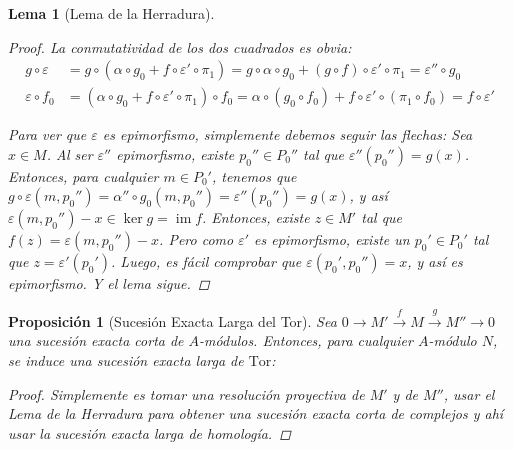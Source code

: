 \documentclass[12pt]{book}
\newtheorem{lem}[teo]{Lema}
\newtheorem{prop}[teo]{Proposición}
\theoremstyle{definition}
\DeclareMathOperator{\im}{im}
\begin{document}
\begin{lem}[Lema de la Herradura]
\begin{proof}
La conmutatividad de los dos cuadrados es obvia: \begin{align*} g\circ\varepsilon &= g\circ(\alpha\circ g_0 + f\circ\varepsilon'\circ\pi_1) = g\circ\alpha\circ g_0 + (g\circ f)\circ \varepsilon'\circ \pi_1 = \varepsilon''\circ g_0 \\ \varepsilon \circ f_0 &= (\alpha\circ g_0 + f\circ \varepsilon'\circ\pi_1)\circ f_0 = \alpha\circ(g_0\circ f_0) + f\circ\varepsilon' \circ (\pi_1\circ f_0) = f\circ \varepsilon'\end{align*}

Para ver que $\varepsilon$ es epimorfismo, simplemente debemos seguir las flechas: Sea $x\in M$. Al ser $\varepsilon''$ epimorfismo, existe $p_0''\in P_0''$ tal que $\varepsilon''(p_0'') = g(x)$. Entonces, para cualquier $m\in P_0'$, tenemos que $g\circ\varepsilon(m,p_0'') = \alpha''\circ g_0(m,p_0'') = \varepsilon''(p_0'') = g(x)$, y así $\varepsilon(m,p_0'')-x \in \ker g = \im f$. Entonces, existe $z\in M'$ tal que $f(z) = \varepsilon(m,p_0'') - x$. Pero como $\varepsilon'$ es epimorfismo, existe un $p_0'\in P_0'$ tal que $z = \varepsilon'(p_0')$. Luego, es fácil comprobar que $\varepsilon(p_0',p_0'') = x$, y así es epimorfismo. Y el lema sigue.

\end{proof}
\end{lem}

\begin{prop}[Sucesión Exacta Larga del Tor]
Sea $0\longrightarrow M'\stackrel{f}{\longrightarrow} M\stackrel{g}{\longrightarrow} M''\longrightarrow 0$ una sucesión exacta corta de $A$-módulos. Entonces, para cualquier $A$-módulo $N$, se induce una sucesión exacta larga de $\mathrm{Tor}$: 
\begin{center}\end{center}
\begin{proof}
Simplemente es tomar una resolución proyectiva de $M'$ y de $M''$, usar el Lema de la Herradura para obtener una sucesión exacta corta de complejos y ahí usar la sucesión exacta larga de homología.
\end{proof}
\end{prop}
\end{document}
